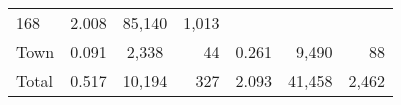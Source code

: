\documentclass[]{book}
\theoremstyle{definition}
\theoremstyle{definition}
\theoremstyle{definition}
\theoremstyle{remark}
\begin{document}
\begin{longtable}[]{@{}lrcrrrr@{}}
\begin{minipage}[t]{0.11\columnwidth}
168\strut
\end{minipage} & \begin{minipage}[t]{0.12\columnwidth}\raggedleft\strut
2.008\strut
\end{minipage} & \begin{minipage}[t]{0.11\columnwidth}\raggedleft\strut
85,140\strut
\end{minipage} & \begin{minipage}[t]{0.11\columnwidth}\raggedleft\strut
1,013\strut
\end{minipage}\tabularnewline
\begin{minipage}[t]{0.10\columnwidth}\raggedright\strut
Town\strut
\end{minipage} & \begin{minipage}[t]{0.12\columnwidth}\raggedleft\strut
0.091\strut
\end{minipage} & \begin{minipage}[t]{0.11\columnwidth}\centering\strut
2,338\strut
\end{minipage} & \begin{minipage}[t]{0.11\columnwidth}\raggedleft\strut
44\strut
\end{minipage} & \begin{minipage}[t]{0.12\columnwidth}\raggedleft\strut
0.261\strut
\end{minipage} & \begin{minipage}[t]{0.11\columnwidth}\raggedleft\strut
9,490\strut
\end{minipage} & \begin{minipage}[t]{0.11\columnwidth}\raggedleft\strut
88\strut
\end{minipage}\tabularnewline
\begin{minipage}[t]{0.10\columnwidth}\raggedright\strut
Total\strut
\end{minipage} & \begin{minipage}[t]{0.12\columnwidth}\raggedleft\strut
0.517\strut
\end{minipage} & \begin{minipage}[t]{0.11\columnwidth}\centering\strut
10,194\strut
\end{minipage} & \begin{minipage}[t]{0.11\columnwidth}\raggedleft\strut
327\strut
\end{minipage} & \begin{minipage}[t]{0.12\columnwidth}\raggedleft\strut
2.093\strut
\end{minipage} & \begin{minipage}[t]{0.11\columnwidth}\raggedleft\strut
41,458\strut
\end{minipage} & \begin{minipage}[t]{0.11\columnwidth}\raggedleft\strut
2,462\strut
\end{minipage}\tabularnewline
\bottomrule
\end{longtable}
\end{document}
